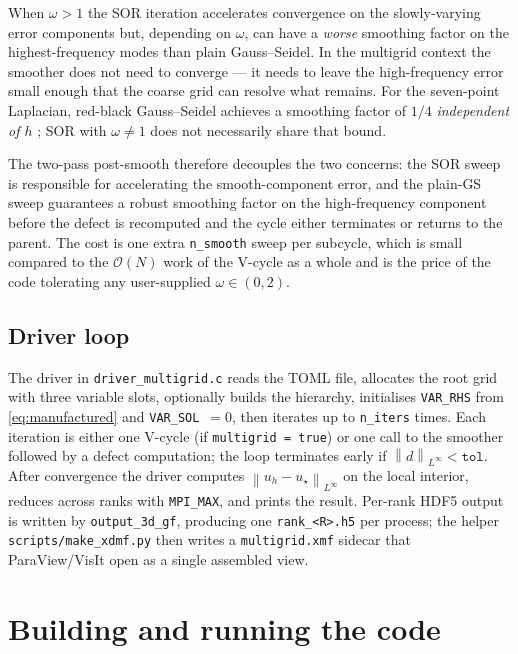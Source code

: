 \documentclass[11pt]{article}
\theoremstyle{definition}
\newcommand{\norm}[1]{\left\lVert #1 \right\rVert}
\newcommand{\Linf}{L^{\infty}}
\newcommand{\bigO}{\mathcal{O}}
\begin{document}
When $\omega > 1$ the SOR iteration accelerates convergence on the
slowly-varying error components but, depending on $\omega$, can have a
\emph{worse} smoothing factor on the highest-frequency modes than plain
Gauss--Seidel.  In the multigrid context the smoother does not need to
converge --- it needs to leave the high-frequency error small enough
that the coarse grid can resolve what remains.  For the seven-point
Laplacian, red-black Gauss--Seidel achieves a smoothing factor of $1/4$
\emph{independent of $h$} \cite[\S2.1]{trottenberg2001multigrid}; SOR
with $\omega \neq 1$ does not necessarily share that bound.

The two-pass post-smooth therefore decouples the two concerns: the SOR
sweep is responsible for accelerating the smooth-component error, and
the plain-GS sweep guarantees a robust smoothing factor on the
high-frequency component before the defect is recomputed and the cycle
either terminates or returns to the parent.  The cost is one extra
\texttt{n\_smooth} sweep per subcycle, which is small compared to the
$\bigO(N)$ work of the V-cycle as a whole and is the price of the code
tolerating any user-supplied $\omega \in (0,2)$.

\subsection{Driver loop}
The driver in \texttt{driver\_multigrid.c} reads the TOML file,
allocates the root grid with three variable slots, optionally builds
the hierarchy, initialises \texttt{VAR\_RHS} from
\eqref{eq:manufactured} and \texttt{VAR\_SOL}~$=0$, then iterates up to
\texttt{n\_iters} times.  Each iteration is either one V-cycle (if
\texttt{multigrid = true}) or one call to the smoother followed by a
defect computation; the loop terminates early if
$\norm{d}_{\Linf} < \texttt{tol}$.  After convergence the driver
computes $\norm{u_h - u_\star}_{\Linf}$ on the local interior, reduces
across ranks with \texttt{MPI\_MAX}, and prints the result.  Per-rank
HDF5 output is written by \texttt{output\_3d\_gf}, producing one
\texttt{rank\_<R>.h5} per process; the helper
\texttt{scripts/make\_xdmf.py} then writes a \texttt{multigrid.xmf}
sidecar that ParaView/VisIt open as a single assembled view.

\section{Building and running the code}\label{sec:build}
\end{document}
